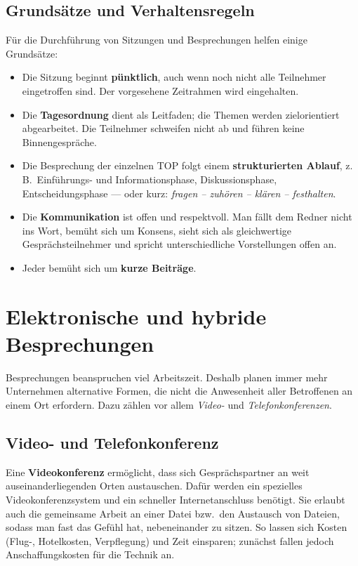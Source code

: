 \documentclass[11pt, a4paper]{article}
\begin{document}
\subsection{Grundsätze und Verhaltensregeln}

Für die Durchführung von Sitzungen und Besprechungen helfen einige Grundsätze:

\begin{itemize}
  \item Die Sitzung beginnt \textbf{pünktlich}, auch wenn noch nicht alle Teilnehmer eingetroffen sind. Der vorgesehene Zeitrahmen wird eingehalten.
  \item Die \textbf{Tagesordnung} dient als Leitfaden; die Themen werden zielorientiert abgearbeitet. Die Teilnehmer schweifen nicht ab und führen keine Binnengespräche.
  \item Die Besprechung der einzelnen TOP folgt einem \textbf{strukturierten Ablauf}, z.\,B.\ Einführungs- und Informationsphase, Diskussionsphase, Entscheidungsphase --- oder kurz: \emph{fragen -- zuhören -- klären -- festhalten}.
  \item Die \textbf{Kommunikation} ist offen und respektvoll. Man fällt dem Redner nicht ins Wort, bemüht sich um Konsens, sieht sich als gleichwertige Gesprächsteilnehmer und spricht unterschiedliche Vorstellungen offen an.
  \item Jeder bemüht sich um \textbf{kurze Beiträge}.
\end{itemize}

\section{Elektronische und hybride Besprechungen}

Besprechungen beanspruchen viel Arbeitszeit. Deshalb planen immer mehr Unternehmen
alternative Formen, die nicht die Anwesenheit aller Betroffenen an einem Ort erfordern. Dazu
zählen vor allem \emph{Video-} und \emph{Telefonkonferenzen}.

\subsection{Video- und Telefonkonferenz}

Eine \textbf{Videokonferenz} ermöglicht, dass sich Gesprächspartner an weit
auseinanderliegenden Orten austauschen. Dafür werden ein spezielles Videokonferenzsystem und
ein schneller Internetanschluss benötigt. Sie erlaubt auch die gemeinsame Arbeit an einer
Datei bzw.\ den Austausch von Dateien, sodass man fast das Gefühl hat, nebeneinander zu
sitzen. So lassen sich Kosten (Flug-, Hotelkosten, Verpflegung) und Zeit einsparen; zunächst
fallen jedoch Anschaffungskosten für die Technik an.
\end{document}
